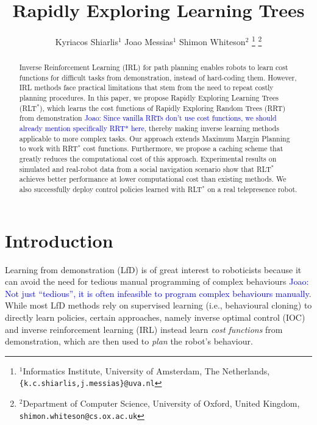 \documentclass[letterpaper, 10 pt, conference]{ieeeconf}
\title{\LARGE \bf
Rapidly Exploring Learning Trees
}
\author{Kyriacos Shiarlis$^{1}$ Joao Messias$^{1}$ Shimon Whiteson$^{2}$%
\thanks{$^{1}$Informatics Institute, University of Amsterdam, The Netherlands,
         {\tt\small \{k.c.shiarlis,j.messias\}@uva.nl}}%
\thanks{$^{2}$Department of Computer Science, University of Oxford, United Kingdom,
         {\tt\small shimon.whiteson@cs.ox.ac.uk}}%
}
\newcommand{\jm}[1]{\textcolor{blue}{Joao: #1}}
\begin{document}
\maketitle

\thispagestyle{empty}
\pagestyle{empty}


\begin{abstract}
Inverse Reinforcement Learning (IRL) for path planning enables robots to learn cost functions for difficult tasks from demonstration, instead of hard-coding them. However, IRL methods face practical limitations that stem from the need to repeat costly planning procedures.
In this paper, we propose Rapidly Exploring Learning Trees (RLT$^*$), which learns the cost functions of Rapidly Exploring Random Trees (RRT) from demonstration \jm{Since vanilla RRTs don't use cost functions, we should already mention specifically RRT* here}, thereby making inverse learning methods applicable to more complex tasks. Our approach extends Maximum Margin Planning to work with RRT$^*$ cost functions. Furthermore, we propose a caching scheme that greatly reduces the computational cost of this approach. Experimental results on simulated and real-robot data from a social navigation scenario show that RLT$^*$ achieves better performance at lower computational cost than existing methods.  We also successfully deploy control policies learned with RLT$^*$ on a real telepresence robot.


\end{abstract}


\section{Introduction}

Learning from demonstration (LfD) \cite{argall2009survey} is of great interest to roboticists because it can avoid the need for tedious manual programming of complex behaviours \jm{Not just ``tedious'', it is often infeasible to program complex behaviours manually}. While most LfD methods rely on supervised learning (i.e., behavioural cloning) to directly learn policies, certain approaches, namely inverse optimal control (IOC) \cite{kalman1964linear} and inverse reinforcement learning (IRL) \cite{abbeel2004apprenticeship} instead learn \emph{cost functions} from demonstration, which are then used to \emph{plan} the robot's behaviour. 
\end{document}
